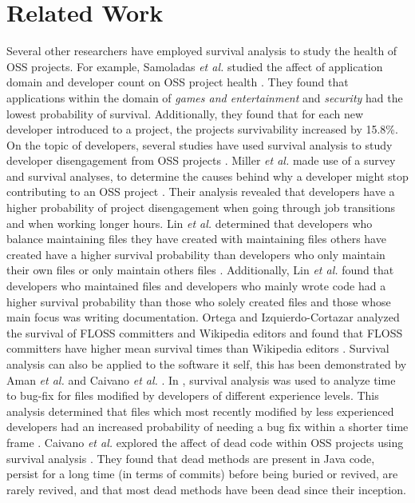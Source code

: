 \documentclass[acmconf]{acmart}
\begin{document}
\section{Related Work} \label{related}

Several other researchers have employed survival analysis to study the health of OSS projects. 
For example, Samoladas \emph{et al.} studied the affect of application domain and developer count on OSS project health \cite{samoladas2010survival}. 
They found that applications within the domain of \emph{games and entertainment} and \emph{security} had the lowest probability of survival. 
Additionally, they found that for each new developer introduced to a project, the projects survivability increased by 15.8\%. 
On the topic of developers, several studies have used survival analysis to study developer disengagement from OSS projects \cite{miller2019people,lin2017developer,ortega2009survival}. 
Miller \emph{et al.} made use of a survey and survival analyses, to determine the causes behind why a developer might stop contributing to an OSS project \cite{miller2019people}. 
Their analysis revealed that developers have a higher probability of project disengagement when going through job transitions and when working longer hours. 
Lin \emph{et al.} determined that developers who balance maintaining files they have created with maintaining files others have created have a higher survival probability than developers who only maintain their own files or only maintain others files \cite{lin2017developer}. 
Additionally, Lin \emph{et al.} found that developers who maintained files and developers who mainly wrote code had a higher survival probability than those who solely created files and those whose main focus was writing documentation. 
Ortega and Izquierdo-Cortazar analyzed the survival of FLOSS committers and Wikipedia editors and found that FLOSS committers have higher mean survival times than Wikipedia editors \cite{ortega2009survival}. 
Survival analysis can also be applied to the software it self, this has been demonstrated by Aman \emph{et al.} and Caivano \emph{et al.} \cite{aman2017survival, caivano2021exploratory}. 
In \cite{aman2017survival}, survival analysis was used to analyze time to bug-fix for files modified by developers of different experience levels. 
This analysis determined that files which most recently modified by less experienced developers had an increased probability of needing a bug fix within a shorter time frame \cite{aman2017survival}. 
Caivano \emph{et al.} explored the affect of dead code within OSS projects using survival analysis \cite{caivano2021exploratory}. 
They found that dead methods are present in Java code, persist for a long time (in terms of commits) before being buried or revived, are rarely revived, and that most dead methods have been dead since their inception. 
\end{document}
